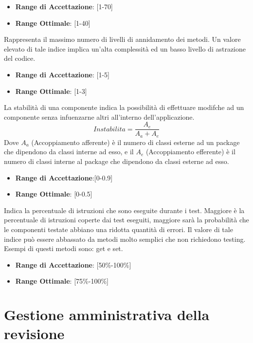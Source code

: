 \documentclass[12pt,a4paper]{article}
\begin{document}
\begin{itemize}
\item \textbf{Range di Accettazione}: [1-70]
\item \textbf{Range Ottimale}: [1-40]
\end{itemize}
Rappresenta il massimo numero di livelli di annidamento dei metodi. Un valore elevato di tale indice implica un’alta complessità ed un basso livello di astrazione del codice.
\begin{itemize}
\item \textbf{Range di Accettazione}: [1-5]
\item \textbf{Range Ottimale}: [1-3]
\end{itemize}
La stabilità di una componente indica la possibilità di effettuare modifche ad un componente senza infuenzarne altri all’interno dell'applicazione.
\[Instabilita=\frac{A_e}{A_a+A_e}\]
Dove $A_a$ (Accoppiamento afferente) è il numero di classi esterne ad un package che dipendono da classi interne ad esso, e il $A_e$ (Accoppiamento efferente) è il numero di classi interne al package che dipendono da classi esterne ad esso.
\begin{itemize}
\item \textbf{Range di Accettazione}:[0-0.9]
\item \textbf{Range Ottimale}: [0-0.5]
\end{itemize}
Indica la percentuale di istruzioni che sono eseguite durante i test. Maggiore è la percentuale di istruzioni coperte dai test eseguiti, maggiore sarà la probabilità che le componenti testate abbiano una ridotta quantità di errori. Il valore di tale indice può essere abbassato da metodi molto semplici che non richiedono testing. Esempi di questi metodi sono: get e set.
\begin{itemize}
\item \textbf{Range di Accettazione}: [50\%-100\%]
\item \textbf{Range Ottimale}: [75\%-100\%]
\end{itemize}

\newpage
\section{Gestione amministrativa della revisione}
\end{document}
